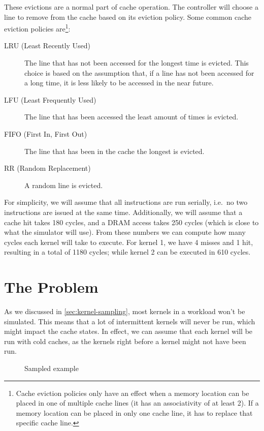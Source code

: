 These evictions are a normal part of cache operation.
The controller will choose a line to remove from the cache based on its eviction policy.
Some common cache eviction policies are\footnote{Cache eviction policies only have an effect when a memory location can be placed in one of multiple cache lines (it has an associativity of at least 2). If a memory location can be placed in only one cache line, it has to replace that specific cache line.}:
\begin{description}
    \item[LRU (Least Recently Used)] The line that has not been accessed for the longest time is evicted.
    This choice is based on the assumption that, if a line has not been accessed for a long time, it is less likely to be accessed in the near future.
    \item[LFU (Least Frequently Used)] The line that has been accessed the least amount of times is evicted.
    \item[FIFO (First In, First Out)] The line that has been in the cache the longest is evicted.
    \item[RR (Random Replacement)] A random line is evicted.
\end{description}

For simplicity, we will assume that all instructions are run serially, i.e.\ no two instructions are issued at the same time.
Additionally, we will assume that a cache hit takes 180 cycles, and a DRAM access takes 250 cycles (which is close to what the simulator will use).
From these numbers we can compute how many cycles each kernel will take to execute.
For kernel 1, we have 4 misses and 1 hit, resulting in a total of 1180 cycles; while kernel 2 can be executed in 610 cycles.

\section{The Problem}\label{sec:the-problem}
As we discussed in \cref{sec:kernel-sampling}, most kernels in a workload won't be simulated.
This means that a lot of intermittent kernels will never be run, which might impact the cache states.
In effect, we can assume that each kernel will be run with cold caches, as the kernels right before a kernel might not have been run.

\begin{figure}[hbt]
    \centering
    \caption{Sampled example}
    \label{fig:flush-exec}
\end{figure}

